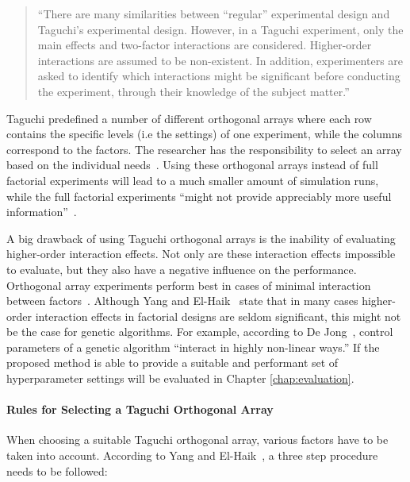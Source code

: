 \begin{quote}
	\begin{em}
		\enquote{There are many similarities between “regular” experimental design and Taguchi's experimental design. However, in a Taguchi experiment, only the main effects and two-factor interactions are considered. Higher-order interactions are assumed to be non-existent. In addition, experimenters are asked to identify which interactions might be significant before conducting the experiment, through their knowledge of the subject matter.}~\cite{yang_design_2009}
	\end{em}
\end{quote}

Taguchi predefined a number of different orthogonal arrays where each row contains the specific levels (i.e the settings) of one experiment, while the columns correspond to the factors. The researcher has the responsibility to select an array based on the individual needs~\cite{li_taguchi_2021}. Using these orthogonal arrays instead of full factorial experiments will lead to a much smaller amount of simulation runs, while the full factorial experiments \enquote{might not provide appreciably more useful information}~\cite{roy_primer_1990}.

A big drawback of using Taguchi orthogonal arrays is the inability of evaluating higher-order interaction effects. Not only are these interaction effects impossible to evaluate, but they also have a negative influence on the performance. Orthogonal array experiments perform best in cases of minimal interaction between factors~\cite{roy_primer_1990}. Although Yang and El-Haik~\cite{yang_design_2009} state that in many cases higher-order interaction effects in factorial designs are seldom significant, this might not be the case for genetic algorithms. For example, according to De Jong~\cite{kacprzyk_parameter_2007}, control parameters of a genetic algorithm \enquote{interact in highly non-linear ways.} If the proposed method is able to provide a suitable and performant set of hyperparameter settings will be evaluated in Chapter \ref{chap:evaluation}.

\paragraph{Rules for Selecting a Taguchi Orthogonal Array}
When choosing a suitable Taguchi orthogonal array, various factors have to be taken into account. According to Yang and El-Haik~\cite{yang_design_2009}, a three step procedure needs to be followed:

